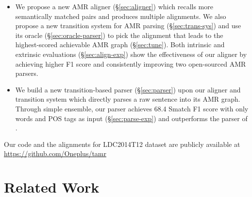 \documentclass[11pt,a4paper]{article}
\begin{document}
\begin{itemize}
	\item We propose a new AMR aligner (\S\ref{sec:aligner}) which recalls 
	more semantically matched pairs and produces multiple alignments.
	We also propose a new transition system for AMR parsing (\S\ref{sec:trans-sys}) and 
	use its oracle (\S\ref{sec:oracle-parser})
	to pick the alignment that leads to the highest-scored achievable AMR graph (\S\ref{sec:tune}).
	Both intrinsic and extrinsic evaluations (\S\ref{sec:align-exp}) show the effectiveness of our aligner
	by achieving higher F1 score and
	consistently improving two open-sourced AMR parsers.
	
	\item We build a new transition-based parser (\S\ref{sec:parser}) upon our aligner and transition system
	which directly parses a raw sentence into its AMR graph.
	Through simple ensemble, our parser achieves 68.4 Smatch F1 score with
	only words and POS tags as input (\S\ref{sec:parse-exp}) and outperforms the parser of \citet{wang-xue:2017:EMNLP2017}.
	
\end{itemize}


Our code and the alignments for LDC2014T12 dataset are publicly available at \url{https://github.com/Oneplus/tamr}

\section{Related Work}

\end{document}
